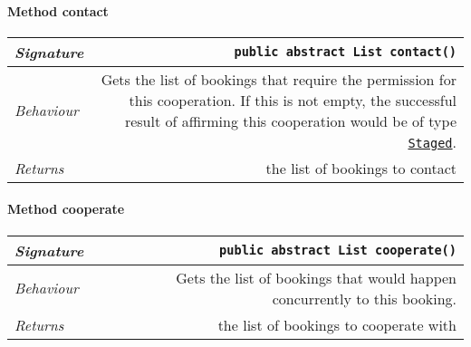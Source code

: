 \begin{adjustwidth}{1.5em}{0pt}
\begin{adjustwidth}{1.5em}{0pt}
\begin{adjustwidth}{1.5em}{0pt}
{\begin{tabularx}{1.0\linewidth}{@{}l R@{}}
      \end{tabularx}}\paragraph{Method contact\label{edu.kit.hci.soli.dto.BookingAttemptResult.PossibleCooperation@contact()}}
      \begin{adjustwidth}{1.5em}{0pt}
        {\begin{tabularx}{1.0\linewidth}{@{}l R@{}}
          \emph{Signature} & \texttt{public abstract \texttt{List} contact()} \\
          \hline
          \emph{Behaviour} & Gets the list of bookings that require the permission for this cooperation. If this is not empty, the successful result of affirming this cooperation would be of type  \texttt{\hyperref[edu.kit.hci.soli.dto.BookingAttemptResult.Staged]{\texttt{Staged}}}.    \\
          \hline
          \emph{Returns} & the list of bookings to contact  \\
          \hline
  
        \end{tabularx}}
      \end{adjustwidth}\paragraph{Method cooperate\label{edu.kit.hci.soli.dto.BookingAttemptResult.PossibleCooperation@cooperate()}}
      \begin{adjustwidth}{1.5em}{0pt}
        {\begin{tabularx}{1.0\linewidth}{@{}l R@{}}
          \emph{Signature} & \texttt{public abstract \texttt{List} cooperate()} \\
          \hline
          \emph{Behaviour} & Gets the list of bookings that would happen concurrently to this booking.    \\
          \hline
          \emph{Returns} & the list of bookings to cooperate with  \\
          \hline
  

\end{tabularx}}
\end{adjustwidth}
\end{adjustwidth}
\end{adjustwidth}
\end{adjustwidth}
